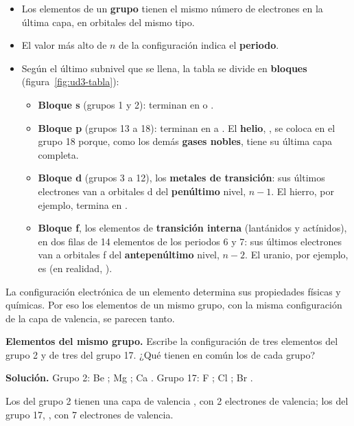 \begin{itemize}
    \item Los elementos de un \textbf{grupo} tienen el mismo número de electrones en la última capa, en orbitales del mismo tipo.
    \item El valor más alto de \(n\) de la configuración indica el \textbf{periodo}.
    \item Según el último subnivel que se llena, la tabla se divide en \textbf{bloques} (figura~\ref{fig:ud3-tabla}):
    \begin{itemize}
        \item \textbf{Bloque s} (grupos 1 y 2): terminan en  o .
        \item \textbf{Bloque p} (grupos 13 a 18): terminan en  a . El \textbf{helio},
        , se coloca en el grupo 18 porque, como los demás \textbf{gases nobles}, tiene su última capa completa.
        \item \textbf{Bloque d} (grupos 3 a 12), los \textbf{metales de transición}: sus últimos electrones van a orbitales d del
        \textbf{penúltimo} nivel, \(n - 1\). El hierro, por ejemplo, termina en .
        \item \textbf{Bloque f}, los elementos de \textbf{transición interna} (lantánidos y actínidos), en dos filas de 14
        elementos de los periodos 6 y 7: sus últimos electrones van a orbitales f del \textbf{antepenúltimo} nivel, \(n - 2\).
        El uranio, por ejemplo, es  (en realidad, ).
    \end{itemize}
\end{itemize}

\begin{remark}
    La configuración electrónica de un elemento determina sus propiedades físicas y químicas. Por eso los elementos de un mismo
    grupo, con la misma configuración de la capa de valencia, se parecen tanto.
\end{remark}

\begin{example}
    \textbf{Elementos del mismo grupo.} Escribe la configuración de tres elementos del grupo 2 y de tres del grupo 17. ¿Qué
    tienen en común los de cada grupo?

    \textbf{Solución.} Grupo 2: Be ; Mg ; Ca .
    Grupo 17: F ; Cl ; Br .

    Los del grupo 2 tienen una capa de valencia , con 2 electrones de valencia; los del grupo 17, ,
    con 7 electrones de valencia.
\end{example}

